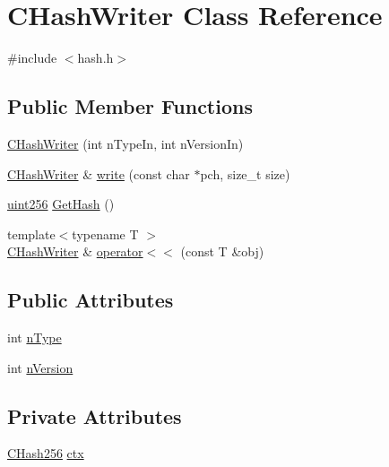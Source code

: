 \hypertarget{class_c_hash_writer}{}\section{C\+Hash\+Writer Class Reference}
\label{class_c_hash_writer}


{\ttfamily \#include $<$hash.\+h$>$}

\subsection*{Public Member Functions}
\begin{DoxyCompactItemize}
\item 
\mbox{\hyperlink{class_c_hash_writer_a81ce9a497a72fcb6b2612efdc20efbc9}{C\+Hash\+Writer}} (int n\+Type\+In, int n\+Version\+In)
\item 
\mbox{\hyperlink{class_c_hash_writer}{C\+Hash\+Writer}} \& \mbox{\hyperlink{class_c_hash_writer_a779360281eeeb4cc7485c8acae649bc9}{write}} (const char $\ast$pch, size\+\_\+t size)
\item 
\mbox{\hyperlink{classuint256}{uint256}} \mbox{\hyperlink{class_c_hash_writer_ae94a937211502eabf19477630090093a}{Get\+Hash}} ()
\item 
{\footnotesize template$<$typename T $>$ }\\\mbox{\hyperlink{class_c_hash_writer}{C\+Hash\+Writer}} \& \mbox{\hyperlink{class_c_hash_writer_a6551aed7315be5ba750680df18562f3a}{operator$<$$<$}} (const T \&obj)
\end{DoxyCompactItemize}
\subsection*{Public Attributes}
\begin{DoxyCompactItemize}
\item 
int \mbox{\hyperlink{class_c_hash_writer_ae8fe02b05db26a2647a7aeee035f022f}{n\+Type}}
\item 
int \mbox{\hyperlink{class_c_hash_writer_ad7d3642addab58385476dc0f9d55fa58}{n\+Version}}
\end{DoxyCompactItemize}
\subsection*{Private Attributes}
\begin{DoxyCompactItemize}
\item 
\mbox{\hyperlink{class_c_hash256}{C\+Hash256}} \mbox{\hyperlink{class_c_hash_writer_aafd99704f526fce95d0f39714a081b54}{ctx}}
\end{DoxyCompactItemize}


